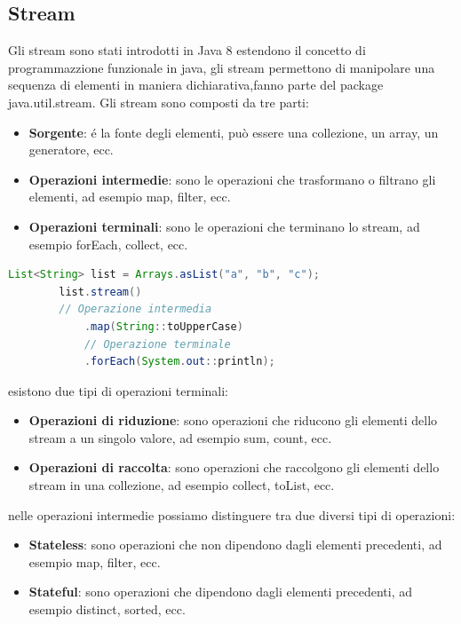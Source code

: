 \documentclass[11pt]{article}
\begin{document}
\subsection{Stream}
    Gli stream sono stati introdotti in Java 8 estendono il concetto di programmazzione funzionale in java, gli stream permettono di manipolare una sequenza di elementi in maniera dichiarativa,fanno parte del package java.util.stream.
    Gli stream sono composti da tre parti:
    \begin{itemize}
        \item \textbf{Sorgente}: é la fonte degli elementi, può essere una collezione, un array, un generatore, ecc.
        \item \textbf{Operazioni intermedie}: sono le operazioni che trasformano o filtrano gli elementi, ad esempio map, filter, ecc.
        \item \textbf{Operazioni terminali}: sono le operazioni che terminano lo stream, ad esempio forEach, collect, ecc.
        \end{itemize}
    \begin{lstlisting}[language=Java]
        List<String> list = Arrays.asList("a", "b", "c");
        list.stream()
        // Operazione intermedia
            .map(String::toUpperCase)
            // Operazione terminale
            .forEach(System.out::println);
    \end{lstlisting}
    esistono due tipi di operazioni terminali:
    \begin{itemize}
        \item \textbf{Operazioni di riduzione}: sono operazioni che riducono gli elementi dello stream a un singolo valore, ad esempio sum, count, ecc.
        \item \textbf{Operazioni di raccolta}: sono operazioni che raccolgono gli elementi dello stream in una collezione, ad esempio collect, toList, ecc.
        \end{itemize}
    nelle operazioni intermedie possiamo distinguere tra due diversi tipi di operazioni:
    \begin{itemize}
        \item \textbf{Stateless}: sono operazioni che non dipendono dagli elementi precedenti, ad esempio map, filter, ecc.
        \item \textbf{Stateful}: sono operazioni che dipendono dagli elementi precedenti, ad esempio distinct, sorted, ecc.
        \end{itemize}
\end{document}
